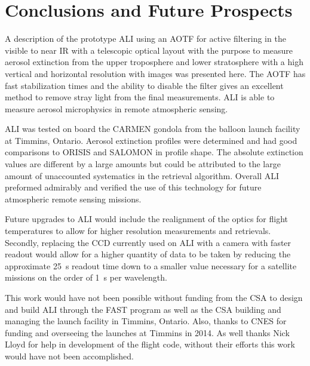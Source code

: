 \documentclass[12pt]{article}
\begin{document}
\section{Conclusions and Future Prospects}

A description of the prototype ALI using an AOTF for active filtering in the visible to near IR with a telescopic optical layout with the purpose to measure aerosol extinction from the upper troposphere and lower stratosphere with a high vertical and horizontal resolution with images was presented here. The AOTF has fast stabilization times and the ability to disable the filter gives an excellent method to remove stray light from the final measurements. ALI is able to measure aerosol microphysics in remote atmospheric sensing.

ALI was tested on board the CARMEN gondola from the balloon launch facility at Timmins, Ontario. Aerosol extinction profiles were determined and had good comparisons to ORISIS and SALOMON in profile shape. The absolute extinction values are different by a large amounts but could be attributed to the large amount of unaccounted systematics in the retrieval algorithm. Overall ALI preformed admirably and verified the use of this technology for future atmospheric remote sensing missions.

Future upgrades to ALI would include the realignment of the optics for flight temperatures to allow for higher resolution measurements and retrievals. Secondly, replacing the CCD currently used on ALI with a camera with faster readout would allow for a higher quantity of data to be taken by reducing the approximate 25~s readout time down to a smaller value necessary for a satellite missions on the order of 1~s per wavelength.

This work would have not been possible without funding from the CSA to design and build ALI through the FAST program as well as the CSA building and managing the launch facility in Timmins, Ontario. Also, thanks to CNES for funding and overseeing the launches at Timmins in 2014. As well thanks Nick Lloyd for help in development of the flight code, without their efforts this work would have not been accomplished.




\newpage
\end{document}

